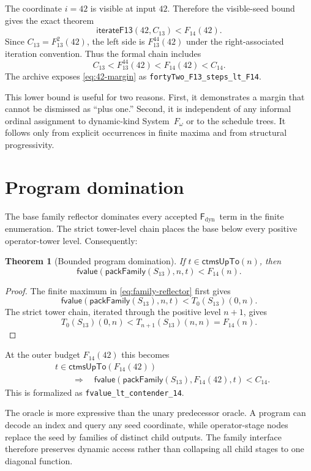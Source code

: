 \documentclass[11pt]{article}
\newtheorem{theorem}{Theorem}[section]
\theoremstyle{definition}
\newcommand{\Fd}{\ensuremath{\mathsf{F}_{\mathrm{dyn}}}}
\newcommand{\lean}[1]{\texttt{#1}}
\newcommand{\pack}{\ensuremath{\mathsf{packFamily}}}
\begin{document}
The coordinate $i=42$ is visible at input $42$.  Therefore the visible-seed
bound gives the exact theorem
\begin{equation}
  \mathsf{iterateF13}(42,C_{13})<F_{14}(42).
\label{eq:42-margin}
\end{equation}
Since $C_{13}=F_{13}^2(42)$, the left side is $F_{13}^{44}(42)$ under the
right-associated iteration convention.  Thus the formal chain includes
\[
  C_{13}<F_{13}^{44}(42)<F_{14}(42)<C_{14}.
\]
The archive exposes \cref{eq:42-margin} as
\lean{fortyTwo\_F13\_steps\_lt\_F14}.

This lower bound is useful for two reasons.  First, it demonstrates a margin
that cannot be dismissed as ``plus one.''  Second, it is independent of any
informal ordinal assignment to dynamic-kind System~$F_\omega$ or to the
schedule trees.  It follows only from explicit occurrences in finite maxima
and from structural progressivity.

\section{Program domination}

The base family reflector dominates every accepted \Fd\ term in the finite
enumeration.  The strict tower-level chain places the base below every positive
operator-tower level.  Consequently:

\begin{theorem}[Bounded program domination]
If $t\in\mathsf{ctmsUpTo}(n)$, then
\[
  \mathsf{fvalue}(\pack(S_{13}),n,t)<F_{14}(n).
\]
\end{theorem}
\begin{proof}
The finite maximum in \cref{eq:family-reflector} first gives
\[
  \mathsf{fvalue}(\pack(S_{13}),n,t)
  <T_0(S_{13})(0,n).
\]
The strict tower chain, iterated through the positive level $n+1$, gives
\[
  T_0(S_{13})(0,n)<T_{n+1}(S_{13})(n,n)=F_{14}(n).
\]
\end{proof}

At the outer budget $F_{14}(42)$ this becomes
\begin{align*}
 &t\in\mathsf{ctmsUpTo}(F_{14}(42))\\
 &\qquad\Longrightarrow\quad
 \mathsf{fvalue}(\pack(S_{13}),F_{14}(42),t)<C_{14}.
\end{align*}
This is formalized as \lean{fvalue\_lt\_contender\_14}.

The oracle is more expressive than the unary predecessor oracle.  A program
can decode an index and query any seed coordinate, while operator-stage nodes
replace the seed by families of distinct child outputs.  The family interface
therefore preserves dynamic access rather than collapsing all child stages to
one diagonal function.
\end{document}
